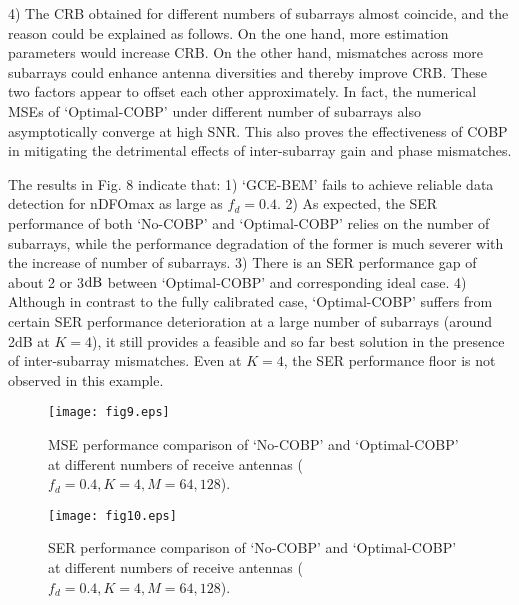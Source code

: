 \documentclass[12pt, draftclsnofoot, onecolumn]{IEEEtran}
\begin{document}
4) The CRB obtained for different numbers of subarrays almost coincide, and the reason could be explained as follows. On the one hand, more estimation parameters would increase CRB. On the other hand, mismatches across more subarrays could enhance antenna diversities and thereby improve CRB. These two factors appear to offset each other approximately. In fact, the numerical MSEs of `Optimal-COBP' under different number of subarrays also asymptotically converge at high SNR. This also proves the effectiveness of COBP in mitigating the detrimental effects of inter-subarray gain and phase mismatches.

The results in Fig. 8 indicate that: 1) `GCE-BEM' fails to achieve reliable data detection for nDFOmax as large as $f_d=0.4$. 2) As expected, the SER performance of both `No-COBP' and `Optimal-COBP' relies on the number of subarrays, while the performance degradation of the former is much severer with the increase of number of subarrays. 3) There is an SER performance gap of about 2 or 3$\rm{dB}$ between `Optimal-COBP' and corresponding ideal case. 4) Although in contrast to the fully calibrated case, `Optimal-COBP' suffers from certain SER performance deterioration at a large number of subarrays (around 2dB at $K=4$), it still provides a feasible and so far best solution in the presence of inter-subarray mismatches. Even at $K=4$, the SER performance floor is not observed in this example.

\begin{figure}[htbp]
\vspace{-1.7em}
\setlength{\abovecaptionskip}{-0.1cm}
\setlength{\belowcaptionskip}{-0.9cm}
  \centering
  \begin{minipage}{80mm}
  \centering
    \texttt{[image: fig9.eps]}
    \caption{ MSE performance comparison of `No-COBP' and `Optimal-COBP' at different numbers of receive antennas ($f_d = 0.4, K=4, M = 64, 128$). }
  \end{minipage}
  \begin{minipage}{80mm}
  \centering
    \texttt{[image: fig10.eps]}
    \caption{ SER performance comparison of `No-COBP' and `Optimal-COBP' at different numbers of receive antennas ($f_d = 0.4, K=4, M = 64, 128$). }
  \end{minipage}
\end{figure}
\end{document}
